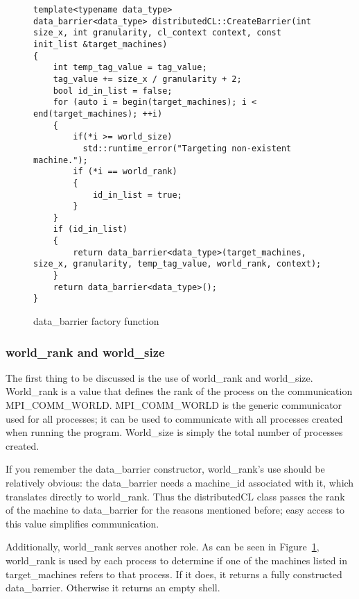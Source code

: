 \documentclass[../thesis.tex]{subfiles}
\begin{document}
    \begin{figure}[htbp]
        \centering
        \lstset{language=cpp}
        \begin{lstlisting}[tabsize=2]
template<typename data_type>
data_barrier<data_type> distributedCL::CreateBarrier(int size_x, int granularity, cl_context context, const init_list &target_machines)
{
    int temp_tag_value = tag_value;
    tag_value += size_x / granularity + 2;
    bool id_in_list = false;
    for (auto i = begin(target_machines); i < end(target_machines); ++i)
    {
        if(*i >= world_size)
          std::runtime_error("Targeting non-existent machine.");
        if (*i == world_rank)
        {
            id_in_list = true;
        }
    }
    if (id_in_list)
    {
        return data_barrier<data_type>(target_machines, size_x, granularity, temp_tag_value, world_rank, context);
    }
    return data_barrier<data_type>();
}
        \end{lstlisting}
        \caption{data\_barrier factory function}
        \label{fig:createbarrier_function}
    \end{figure}

    \subsubsection{world\_rank and world\_size} %
    \label{ssub:world_rank_and_world_size}
        The first thing to be discussed is the use of world\_rank and world\_size. World\_rank is a value that defines the rank of the process on the communication MPI\_COMM\_WORLD. MPI\_COMM\_WORLD is the generic communicator used for all processes; it can be used to communicate with all processes created when running the program. World\_size is simply the total number of processes created.

        If you remember the data\_barrier constructor, world\_rank's use should be relatively obvious: the data\_barrier needs a machine\_id associated with it, which translates directly to world\_rank. Thus the distributedCL class passes the rank of the machine to data\_barrier for the reasons mentioned before; easy access to this value simplifies communication.

        Additionally, world\_rank serves another role. As can be seen in Figure~\ref{fig:createbarrier_function}, world\_rank is used by each process to determine if one of the machines listed in target\_machines refers to that process. If it does, it returns a fully constructed data\_barrier. Otherwise it returns an empty shell.
\end{document}
